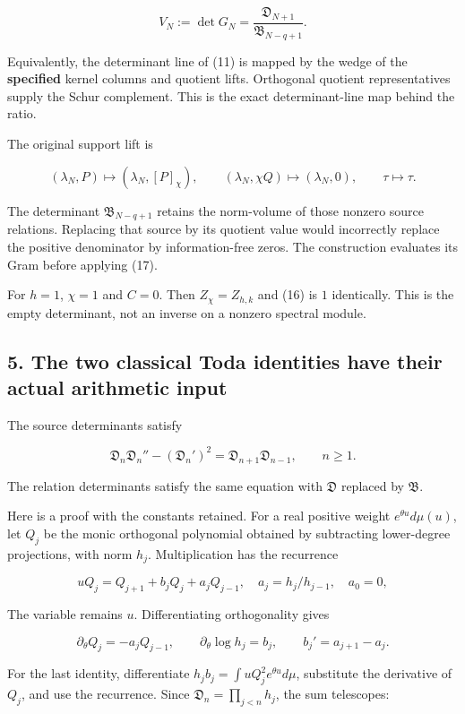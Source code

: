 \[
\boxed{V_N:=\det G_N=\frac{\mathfrak D_{N+1}}{\mathfrak B_{N-q+1}}.}
\tag{16}
\]

Equivalently, the determinant line of (11) is mapped by the wedge of the
\textbf{specified} kernel columns and quotient lifts. Orthogonal
quotient representatives supply the Schur complement. This is the exact
determinant-line map behind the ratio.

The original support lift is

\[
(\lambda_N,P)\longmapsto(\lambda_N,[P]_\chi),\qquad
(\lambda_N,\chi Q)\longmapsto(\lambda_N,0),\qquad \tau\longmapsto\tau.
\tag{17}
\]

The determinant \(\mathfrak B_{N-q+1}\) retains the norm-volume of those
nonzero source relations. Replacing that source by its quotient value
would incorrectly replace the positive denominator by information-free
zeros. The construction evaluates its Gram before applying (17).

For \(h=1\), \(\chi=1\) and \(C=0\). Then \(Z_\chi=Z_{h,k}\) and (16) is
\(1\) identically. This is the empty determinant, not an inverse on a
nonzero spectral module.

\subsection{5. The two classical Toda identities have their actual
arithmetic
input}\label{toda_volume:the-two-classical-toda-identities-have-their-actual-arithmetic-input}

The source determinants satisfy

\[
\boxed{
\mathfrak D_n\mathfrak D_n''-(\mathfrak D_n')^2
=\mathfrak D_{n+1}\mathfrak D_{n-1},\qquad n\ge1.
}
\tag{18}
\]

The relation determinants satisfy the same equation with \(\mathfrak D\)
replaced by \(\mathfrak B\).

Here is a proof with the constants retained. For a real positive weight
\(e^{\theta u}d\mu(u)\), let \(Q_j\) be the monic orthogonal polynomial
obtained by subtracting lower-degree projections, with norm \(h_j\).
Multiplication has the recurrence

\[
u Q_j=Q_{j+1}+b_jQ_j+a_jQ_{j-1},\quad a_j=h_j/h_{j-1},\quad a_0=0,
\]

The variable remains \(u\). Differentiating orthogonality gives

\[
\partial_\theta Q_j=-a_jQ_{j-1},\qquad
\partial_\theta\log h_j=b_j,\qquad b_j'=a_{j+1}-a_j.
\]

For the last identity, differentiate
\(h_jb_j=\int uQ_j^2e^{\theta u}d\mu\), substitute the derivative of
\(Q_j\), and use the recurrence. Since \(\mathfrak D_n=\prod_{j<n}h_j\),
the sum telescopes:

